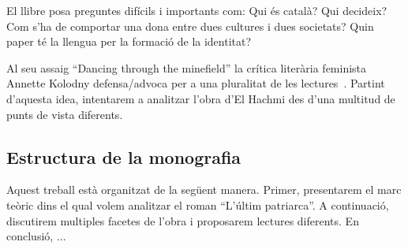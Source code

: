 El llibre posa preguntes difícils i importants com:
Qui és català? Qui decideix?
Com s'ha de comportar una dona entre dues cultures i dues societats?
Quin paper té la llengua per la formació de la identitat?

Al seu assaig ``Dancing through the minefield'' la crítica literària feminista Annette Kolodny defensa/advoca per a una pluralitat de les lectures~\autocite{Kolodny1980}.
Partint d'aquesta idea, intentarem a analitzar l'obra d'El Hachmi des d'una multitud de punts de vista diferents.

\subsection{Estructura de la monografia}
Aquest treball està organitzat de la següent manera.
Primer, presentarem el marc teòric dins el qual volem analitzar el roman ``L'últim patriarca''.
A continuació, discutirem multiples facetes de l'obra i proposarem lectures diferents.
En conclusió, ...

\begin{comment}
Fragestellung:
??
verschiedene readings anbieten:
* interseccionalitat
* translation/language
* laurie penny

--> adrienne rich/anette kolodny in die intro nehmen
Annette Kolodny: "In my view, our purpose is not and should not be the formulation of
any single reading method or potentially procrustean set of critical procedures[...] Instead, as I see it, our
task is to initiate nothing less than a playful pluralism, responsice to the possibilities of multiple critical
schools and methods, but captive of none.."

Leitfragen/themen:
* Qui és català? Qui decideix?
* La dona entre dues cultures i dues societats: expectacions, sentiments,... | interseccionalitat
* La dona en una societat machista                                           |
* coming-of-age
* el paper de la llengua

------

Motto candidates:

“The greatest masterpiece in literature is only a dictionary out of order.”
― Jean Cocteau
VA: Jean Cocteau once quipped that even the greatest masterpieces of literature are nothing but a
dictionary out of order.
(Stavans: Dictionaries Interview)

"IS: Every translation is a misrepresentation."
(Stavans: Dictionaries Interview)
\end{comment}
